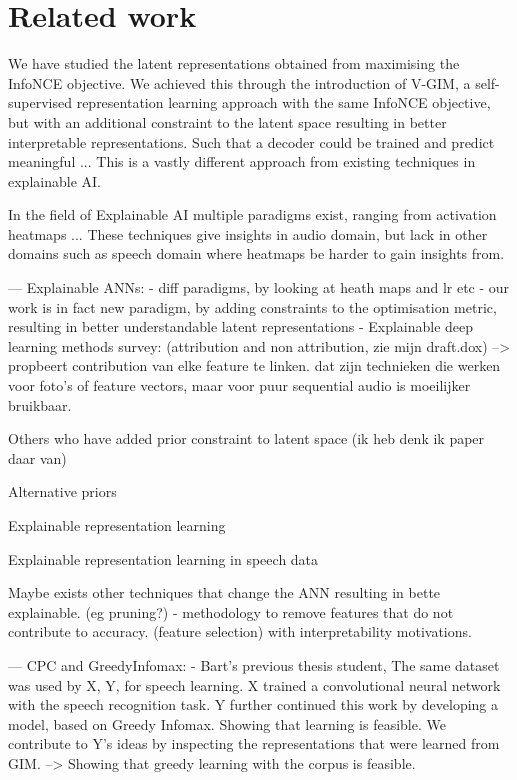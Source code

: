 
\chapter{Related work}
We have studied the latent representations obtained from maximising the InfoNCE objective. 
We achieved this through the introduction of V-GIM, a self-supervised representation learning approach with the same InfoNCE objective, but with an additional constraint to the latent space resulting in better interpretable representations. Such that a decoder could be trained and predict meaningful ...
This is a vastly different approach from existing techniques in explainable AI.

In the field of Explainable AI multiple paradigms exist, ranging from activation heatmaps ...
These techniques give insights in audio domain, but lack in other domains such as speech domain where heatmaps be harder to gain insights from.




---
Explainable ANNs:
	- diff paradigms, by looking at heath maps and lr etc
	- our work is in fact new paradigm, by adding constraints to the optimisation metric, resulting in better understandable latent representations
	- Explainable deep learning methods survey: \cite{baiExplainableDeepLearning2021} (attribution and non attribution, zie mijn draft.dox) --> propbeert contribution van elke feature te linken. dat zijn technieken die werken voor foto's of feature vectors, maar voor puur sequential audio is moeilijker bruikbaar.

Others who have added prior constraint to latent space (ik heb denk ik paper daar van)

Alternative priors

Explainable representation learning

Explainable representation learning in speech data


Maybe exists other techniques that change the ANN resulting in bette explainable. (eg pruning?)
	- methodology to remove features that do not contribute to accuracy. (feature selection) with interpretability motivations. \cite{glorfeldMethodologySimplificationInterpretation1996}

---
CPC and GreedyInfomax:
	- Bart's previous thesis student,
		The same dataset was used by X, Y, for speech learning. X trained a convolutional neural network with the speech recognition task. Y further continued this work by developing a model, based on Greedy Infomax. Showing that learning is feasible. We contribute to Y’s ideas by inspecting the representations that were learned from GIM.
		--> Showing that greedy learning with the corpus is feasible.





